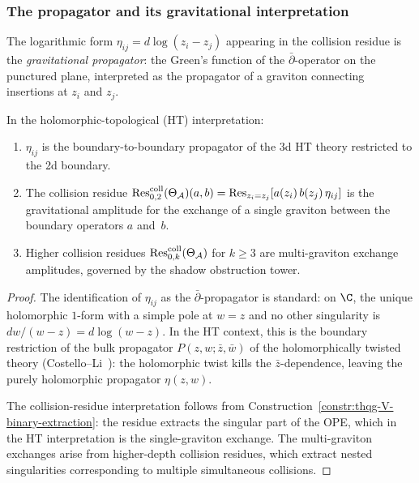 \subsubsection{The propagator and its gravitational interpretation}

\begin{proposition}
\label{prop:thqg-V-gravitational-propagator}
The logarithmic form $\eta_{ij} = d\log(z_i - z_j)$ appearing in
the collision residue is the \emph{gravitational propagator}: the
Green's function of the $\bar\partial$-operator on the punctured
plane, interpreted as the propagator of a graviton connecting
insertions at $z_i$ and $z_j$.

In the holomorphic-topological (HT) interpretation:
\begin{enumerate}[label=\textup{(\roman*)}]
\item $\eta_{ij}$ is the boundary-to-boundary propagator of
 the 3d HT theory restricted to the 2d boundary.
\item The collision residue
 $\operatorname{Res}^{\mathrm{coll}}_{0,2}(\Theta_{\mathcal{A}})(a,b) =
 \operatorname{Res}_{z_i = z_j}[a(z_i)\,b(z_j)\,\eta_{ij}]$
 is the gravitational amplitude for the exchange of a single
 graviton between the boundary operators $a$ and~$b$.
\item Higher collision residues
 $\operatorname{Res}^{\mathrm{coll}}_{0,k}(\Theta_{\mathcal{A}})$ for $k \geq 3$ are multi-graviton
 exchange amplitudes, governed by the shadow obstruction tower.
\end{enumerate}
\end{proposition}

\begin{proof}
The identification of $\eta_{ij}$ as the $\bar\partial$-propagator
is standard: on $\C$, the unique holomorphic $1$-form with a simple
pole at $w = z$ and no other singularity is
$dw/(w - z) = d\log(w - z)$. In the HT context, this is the
boundary restriction of the bulk propagator
$P(z,w;\bar{z},\bar{w})$ of the holomorphically twisted theory
(Costello--Li~\cite{CL20}): the holomorphic twist kills the
$\bar{z}$-dependence, leaving the purely holomorphic propagator
$\eta(z,w)$.

The collision-residue interpretation follows from
Construction~\ref{constr:thqg-V-binary-extraction}: the residue
extracts the singular part of the OPE, which in the HT interpretation
is the single-graviton exchange. The multi-graviton exchanges arise
from higher-depth collision residues, which extract nested singularities
corresponding to multiple simultaneous collisions.
\end{proof}


